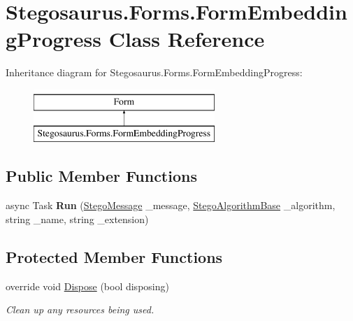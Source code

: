 \hypertarget{class_stegosaurus_1_1_forms_1_1_form_embedding_progress}{}\section{Stegosaurus.\+Forms.\+Form\+Embedding\+Progress Class Reference}
\label{class_stegosaurus_1_1_forms_1_1_form_embedding_progress}
Inheritance diagram for Stegosaurus.\+Forms.\+Form\+Embedding\+Progress\+:\begin{figure}[H]
\begin{center}
\leavevmode
\includegraphics[height=2.000000cm]{class_stegosaurus_1_1_forms_1_1_form_embedding_progress}
\end{center}
\end{figure}
\subsection*{Public Member Functions}
\begin{DoxyCompactItemize}
\item 
async Task {\bfseries Run} (\hyperlink{class_stegosaurus_1_1_stego_message}{Stego\+Message} \+\_\+message, \hyperlink{class_stegosaurus_1_1_algorithm_1_1_stego_algorithm_base}{Stego\+Algorithm\+Base} \+\_\+algorithm, string \+\_\+name, string \+\_\+extension)\hypertarget{class_stegosaurus_1_1_forms_1_1_form_embedding_progress_af74aededc4f874344a835fd5f9666867}{}\label{class_stegosaurus_1_1_forms_1_1_form_embedding_progress_af74aededc4f874344a835fd5f9666867}

\end{DoxyCompactItemize}
\subsection*{Protected Member Functions}
\begin{DoxyCompactItemize}
\item 
override void \hyperlink{class_stegosaurus_1_1_forms_1_1_form_embedding_progress_ab0fd642aa396f03edcc0315891d963ff}{Dispose} (bool disposing)
\begin{DoxyCompactList}\small\item\em Clean up any resources being used. \end{DoxyCompactList}\end{DoxyCompactItemize}


